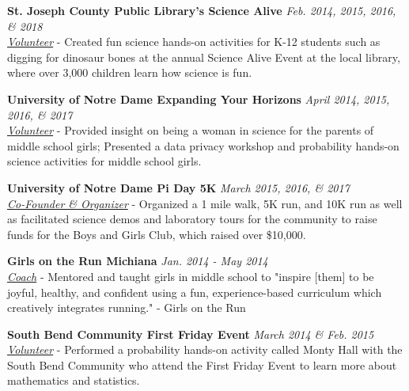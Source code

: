 \outreachspace
\textbf{St. Joseph County Public Library's Science Alive} \hfill \textit{Feb. 2014, 2015, 2016, \& 2018}\\
\textit{\href{http://sjcpl.lib.in.us/sciencealive/}{Volunteer}} - Created fun science hands-on activities for K-12 students such as digging for dinosaur bones at the annual Science Alive Event at the local library, where over 3,000 children learn how science is fun.

\outreachspace
\textbf{University of Notre Dame Expanding Your Horizons} \hfill \textit{April 2014, 2015, 2016, \& 2017}\\
\textit{\href{http://www.expandingyourhorizons.org/conferences/NotreDame/}{Volunteer}} - Provided insight on being a woman in science for the parents of middle school girls; Presented a data privacy workshop and probability hands-on science activities for middle school girls. 

\outreachspace
\textbf{University of Notre Dame Pi Day 5K} \hfill \textit{March 2015, 2016, \& 2017}\\
\textit{\href{http://www.awis.nd.edu/piday5k}{Co-Founder \& Organizer}} - Organized a 1 mile walk, 5K run, and 10K run as well as facilitated science demos and laboratory tours for the community to raise funds for the Boys and Girls Club, which raised over \$10,000.


\outreachspace
\textbf{Girls on the Run Michiana} \hfill \textit{Jan. 2014 - May 2014}\\
\textit{\href{http://www.girlsontherunmichiana.org/}{Coach}} - Mentored and taught girls in middle school to "inspire [them] to be joyful, healthy, and confident using a fun, experience-based curriculum which creatively integrates running." - Girls on the Run

\outreachspace
\textbf{South Bend Community First Friday Event} \hfill \textit{March 2014 \& Feb. 2015}\\
\textit{\href{http://acms.nd.edu/news/47182-acms-first-friday-mad-about-science/}{Volunteer}} - Performed a probability hands-on activity called Monty Hall with the South Bend Community who attend the First Friday Event to learn more about mathematics and statistics.

